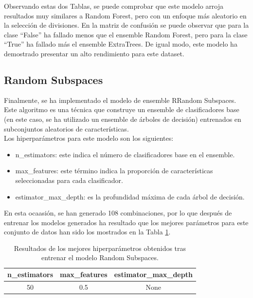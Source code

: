 \documentclass[12pt,letterpaper]{article}
\begin{document}
Observando estas dos Tablas, se puede comprobar que este modelo arroja resultados muy similares a Random Forest, pero con un enfoque más aleatorio en la selección de divisiones. En la matriz de confusión se puede observar que para la clase ``False'' ha fallado menos que el ensemble Random Forest, pero para la clase ``True'' ha fallado más el ensemble ExtraTrees. De igual modo, este modelo ha demostrado presentar un alto rendimiento para este dataset.

\subsection{Random Subspaces}
Finalmente, se ha implementado el modelo de ensemble RRandom Subspaces. Este algoritmo es una técnica que construye un ensemble de clasificadores base (en este caso, se ha utilizado un ensemble de árboles de decisión) entrenados en subconjuntos aleatorios de características.\\
Los hiperparámetros para este modelo son los siguientes:
\begin{itemize}
    \item n\_estimators: este indica el número de clasificadores base en el ensemble.
    \item max\_features: este término indica la proporción de características seleccionadas para cada clasificador.
    \item estimator\_max\_depth: es la profundidad máxima de cada árbol de decisión.
\end{itemize}

En esta ocaasión, se han generado 108 combinaciones, por lo que después de entrenar los modelos generados ha resultado que los mejores parámetros para este conjunto de datos han sido los mostrados en la Tabla \ref{tab:hiper-RS}.
\begin{table}[H]
    \centering
    \begin{tabular}{ccc}
    \hline
    \textbf{n\_estimators} &  \textbf{max\_features} & \textbf{estimator\_max\_depth } \\ \hline
    50 & 0.5 & None \\ \hline
    \end{tabular}
    \caption{Resultados de los mejores hiperparámetros obtenidos tras entrenar el modelo Random Subspaces.}
    \label{tab:hiper-RS}
\end{table}
\end{document}
